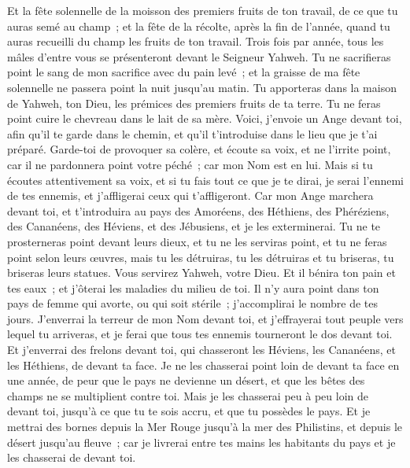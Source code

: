 \begin{multicols}{2}
Et la fête solennelle de la moisson des premiers fruits de ton travail, de ce que tu auras semé au champ~; et la fête de la récolte, après la fin de l'année, quand tu auras recueilli du champ les fruits de ton travail.
Trois fois par année, tous les mâles d'entre vous se présenteront devant le Seigneur Yahweh.
Tu ne sacrifieras point le sang de mon sacrifice avec du pain levé~; et la graisse de ma fête solennelle ne passera point la nuit jusqu'au matin.
Tu apporteras dans la maison de Yahweh, ton Dieu, les prémices des premiers fruits de ta terre. Tu ne feras point cuire le chevreau dans le lait de sa mère.
Voici, j'envoie un Ange devant toi, afin qu'il te garde dans le chemin, et qu'il t'introduise dans le lieu que je t'ai préparé.
Garde-toi de provoquer sa colère, et écoute sa voix, et ne l'irrite point, car il ne pardonnera point votre péché~; car mon Nom est en lui.
Mais si tu écoutes attentivement sa voix, et si tu fais tout ce que je te dirai, je serai l'ennemi de tes ennemis, et j'affligerai ceux qui t'affligeront.
Car mon Ange marchera devant toi, et t'introduira au pays des Amoréens, des Héthiens, des Phéréziens, des Cananéens, des Héviens, et des Jébusiens, et je les exterminerai.
Tu ne te prosterneras point devant leurs dieux, et tu ne les serviras point, et tu ne feras point selon leurs œuvres, mais tu les détruiras, tu les détruiras et tu briseras, tu briseras leurs statues.
Vous servirez Yahweh, votre Dieu. Et il bénira ton pain et tes eaux~; et j'ôterai les maladies du milieu de toi.
Il n'y aura point dans ton pays de femme qui avorte, ou qui soit stérile~; j'accomplirai le nombre de tes jours.
J'enverrai la terreur de mon Nom devant toi, et j'effrayerai tout peuple vers lequel tu arriveras, et je ferai que tous tes ennemis tourneront le dos devant toi.
Et j'enverrai des frelons devant toi, qui chasseront les Héviens, les Cananéens, et les Héthiens, de devant ta face.
Je ne les chasserai point loin de devant ta face en une année, de peur que le pays ne devienne un désert, et que les bêtes des champs ne se multiplient contre toi.
Mais je les chasserai peu à peu loin de devant toi, jusqu'à ce que tu te sois accru, et que tu possèdes le pays.
Et je mettrai des bornes depuis la Mer Rouge jusqu'à la mer des Philistins, et depuis le désert jusqu'au fleuve~; car je livrerai entre tes mains les habitants du pays et je les chasserai de devant toi.

\end{multicols}
